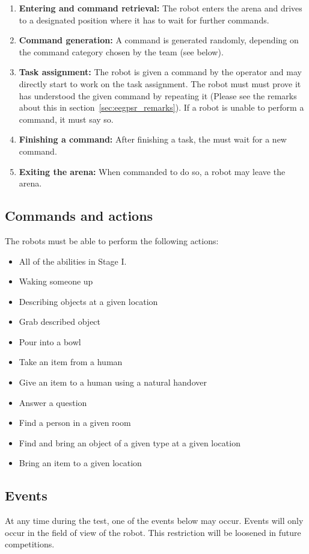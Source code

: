 \begin{enumerate}
	\item \textbf{Entering and command retrieval:} The robot enters the arena and drives to a designated position where it has to wait for further commands.
	\item \textbf{Command generation:} A command is generated randomly, depending on the command category chosen by the team (see below).
	\item \textbf{Task assignment:} The robot is given a command by the operator and may directly start to work on the task assignment. 
	The robot must must prove it has understood the given command by repeating it (Please see the remarks about this in section~\ref{sec:eegpsr_remarks}).
	If a robot is unable to perform a command, it must say so. 
	\item \textbf{Finishing a command:} After finishing a task, the must wait for a new command.
	\item \textbf{Exiting the arena:} When commanded to do so, a robot may leave the arena. 
\end{enumerate}

\subsection{Commands and actions}


The robots must be able to perform the following actions:
\begin{itemize}
 \item All of the abilities in Stage I. 
 \item Waking someone up
 \item Describing objects at a given location
 \item Grab described object
 \item Pour into a bowl
 \item Take an item from a human
 \item Give an item to a human using a natural handover
 \item Answer a question
 \item Find a person in a given room
 \item Find and bring an object of a given type at a given location
 \item Bring an item to a given location
\end{itemize}


\subsection{Events}
At any time during the test, one of the events below may occur. 
Events will only occur in the field of view of the robot. 
This restriction will be loosened in future competitions. 

